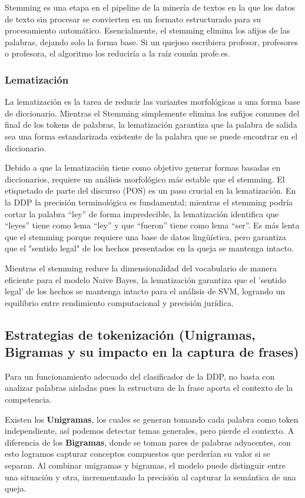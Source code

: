 Stemming es una etapa en el pipeline de la minería de textos en la que los datos de texto sin procesar se convierten en un formato estructurado para su procesamiento automático. Esencialmente, el stemming elimina los afijos de las palabras, dejando solo la forma base. Si un quejoso escribiera profesor, profesores o profesora, el algoritmo los reduciría a la raíz común profe.es.

\subsubsection{Lematización}

La lematización es la tarea de reducir las variantes morfológicas a una forma base de diccionario. Mientras el Stemming simplemente elimina los sufijos comunes del final de los tokens de palabras, la lematización garantiza que la palabra de salida sea una forma estandarizada existente de la palabra que se puede encontrar en el diccionario.

Debido a que la lematización tiene como objetivo generar formas basadas en diccionarios, requiere un análisis morfológico más estable que el stemming. El etiquetado de parte del discurso (POS) es un paso crucial en la lematización. En la DDP la precisión terminológica es fundamental; mientras el stemming podría cortar la palabra “ley” de forma impredecible, la lematización identifica que “leyes” tiene como lema “ley” y que “fueron” tiene como lema “ser”. Es más lenta que el stemming porque requiere una base de datos lingüística, pero garantiza que el "sentido legal" de los hechos presentados en la queja se mantenga intacto.

Mientras el stemming reduce la dimensionalidad del vocabulario de manera eficiente para el modelo Naive Bayes, la lematización garantiza que el 'sentido legal' de los hechos se mantenga intacto para el análisis de SVM, logrando un equilibrio entre rendimiento computacional y precisión jurídica.


\subsection{Estrategias de tokenización (Unigramas, Bigramas y su impacto en la captura de frases)}

Para un funcionamiento adecuado del clasificador de la DDP, no basta con analizar palabras aisladas pues la estructura de la frase aporta el contexto de la competencia.

Existen los \textbf{Unigramas}, los cuales se generan tomando cada palabra como token independiente, así podemos detectar temas generales, pero pierde el contexto. A diferencia de los \textbf{Bigramas}, donde se toman pares de palabras adyacentes, con esto logramos capturar conceptos compuestos que perderían su valor si se separan. Al combinar unigramas y bigramas, el modelo puede distinguir entre una situación y otra, incrementando la precisión al capturar la semántica de una queja.

